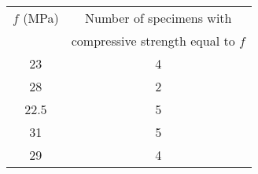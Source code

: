 
    \begin{tabular}{cc}
        \toprule
        \( f \) (MPa) & Number of specimens with \\
                      & compressive strength equal to \( f \) \\
        \midrule
        23   & 4 \\
        28   & 2 \\
        22.5 & 5 \\
        31   & 5 \\
        29   & 4 \\
        \bottomrule
    \end{tabular}
